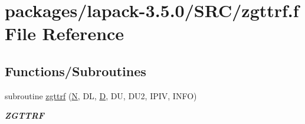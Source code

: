 \hypertarget{zgttrf_8f}{}\section{packages/lapack-\/3.5.0/\+S\+R\+C/zgttrf.f File Reference}
\label{zgttrf_8f}
\subsection*{Functions/\+Subroutines}
\begin{DoxyCompactItemize}
\item 
subroutine \hyperlink{group__complex16GTcomputational_ga148e6aee5b49528c292d9425e415c8ab}{zgttrf} (\hyperlink{polmisc_8c_a0240ac851181b84ac374872dc5434ee4}{N}, D\+L, \hyperlink{odrpack_8h_a7dae6ea403d00f3687f24a874e67d139}{D}, D\+U, D\+U2, I\+P\+I\+V, I\+N\+F\+O)
\begin{DoxyCompactList}\small\item\em {\bfseries Z\+G\+T\+T\+R\+F} \end{DoxyCompactList}\end{DoxyCompactItemize}
